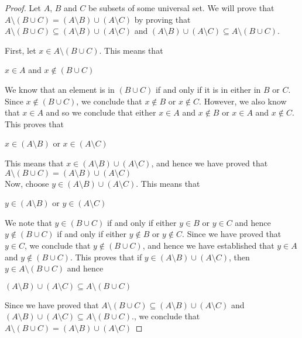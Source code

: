 \documentclass{book}
\theoremstyle{definition}
\begin{document}
\begin{proof}
    Let $A$, $B$ and $C$ be subsets of some universal set. We will prove that $ A \setminus (B \cup C) = (A \setminus B) \cup (A \setminus C)$ by proving that  $A \setminus (B \cup C) \subseteq (A \setminus B) \cup (A \setminus C)$ and $(A \setminus B) \cup (A \setminus C) \subseteq A \setminus (B \cup C) $.
    
    First, let $x \in A \setminus (B \cup C)$. This means that 
        \begin{center}
            $x \in A$ and $x \notin (B \cup C)$
        \end{center}
    We know that an element is in $(B \cup C)$ if and only if it is in either in $B$ or $C$. Since $x \notin (B \cup C)$, we conclude that $x \notin B$ or $x \notin C$. However, we also know that  $x \in A$ and so we conclude that either $x \in A$ and $x \notin B$ or $x \in A$ and $x \notin C$. This proves that 
        \begin{center}
            $x \in (A \setminus B)$ or  $x \in (A \setminus C)$
        \end{center}
    This means that $x \in (A \setminus B) \cup (A \setminus C)$, and hence we have proved that $ A \setminus (B \cup C) = (A \setminus B) \cup (A \setminus C)$ \\
    
    Now, choose $y \in (A \setminus B) \cup (A \setminus C)$. This means that
        \begin{center}
            $y \in (A \setminus B)$ or  $y \in (A \setminus C)$         
        \end{center}
    We note that $y \in (B \cup C)$ if and only if either $y \in B$ or $y \in C$ and hence $y \notin (B \cup C)$ if and only if either $y \notin B$ or $y \notin C$. Since we have proved that $y \in C$, we conclude that $y \notin (B \cup C)$, and hence we have established that $y \in A$ and $y \notin (B \cup C)$. This proves that if $y \in (A \setminus B) \cup (A \setminus C)$, then $y \in A \setminus (B \cup C)$ and hence
        \begin{center}
            $(A \setminus B) \cup (A \setminus C) \subseteq A \setminus (B \cup C) $
        \end{center}
    Since we have proved that  $A \setminus (B \cup C) \subseteq (A \setminus B) \cup (A \setminus C)$ and $(A \setminus B) \cup (A \setminus C) \subseteq A \setminus (B \cup C) $., we conclude that  $A \setminus (B \cup C) = (A \setminus B) \cup (A \setminus C)$
   
\end{proof}
\end{document}
